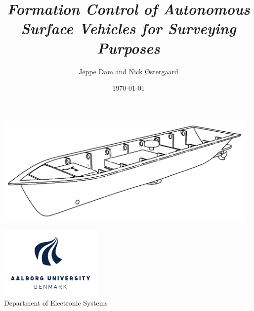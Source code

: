 \author{Jeppe Dam and Nick Østergaard}
\title{\textbf{\emph{Formation Control of Autonomous Surface Vehicles for Surveying Purposes}}}
\date{\today}
\maketitle
\thispagestyle{empty}
\begin{center}
	\includegraphics[width=13cm]{frontmatter/aauship}
\end{center}
\vfill
\begin{center}
	\includegraphics[width=5cm]{frontmatter/AAU_LOGO_CMYK_UK}\\
	Department of Electronic Systems
\end{center}
\clearpage
\restoregeometry

